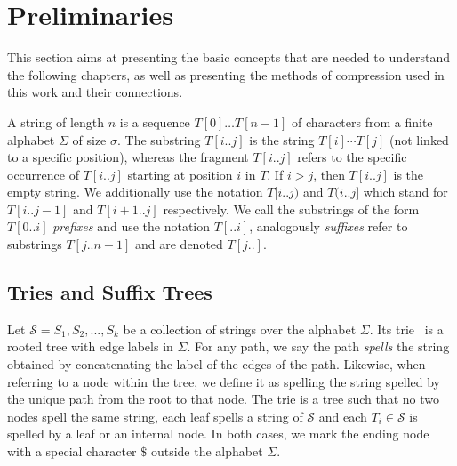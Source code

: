 \section{Preliminaries}\label{sec:prelim}

This section aims at presenting the basic concepts that are needed to understand the following chapters, as well as presenting the methods of compression used in this work and their connections.

A string of length $n$ is a sequence $T[0] \dots T[n-1]$ of characters from a finite alphabet $\Sigma$ of size $\sigma$. The substring $T[i..j]$ is the string $T[i] \cdots T[j]$ (not linked to a specific position), whereas the fragment $T[i..j]$ refers to the specific occurrence of $T[i..j]$ starting at position $i$ in $T$. If $i > j$, then $T[i..j]$ is the empty string. We additionally use the notation $T[i..j)$ and $T(i..j]$ which stand for $T[i..j-1]$ and $T[i+1..j]$ respectively. We call the substrings of the form $T[0..i]$ \emph{prefixes}  and use the notation $T[..i]$, analogously \emph{suffixes} refer to substrings $T[j..n-1]$ and are denoted $T[j..]$.

\subsection{Tries and Suffix Trees}\label{sec:prelim:tries}
Let $\mathcal{S} = {S_1,S_2, ..., S_k}$ be a collection of strings over the alphabet $\Sigma$. Its trie~\cite{thue1912gegenseitige,de1959file,fredkin1960trie} is a rooted tree with edge labels in $\Sigma$.
For any path, we say the path \emph{spells} the string obtained by concatenating the label of the edges of the path.
Likewise, when referring to a node within the tree, we define it as spelling the string spelled by the unique path from the root to that node.
The trie is a tree such that no two nodes spell the same string, each leaf spells a string of $\mathcal{S}$ and each $T_i \in \mathcal{S}$ is spelled by a leaf or an internal node. In both cases, we mark the ending node with a special character $\$$ outside the alphabet $\Sigma$.


